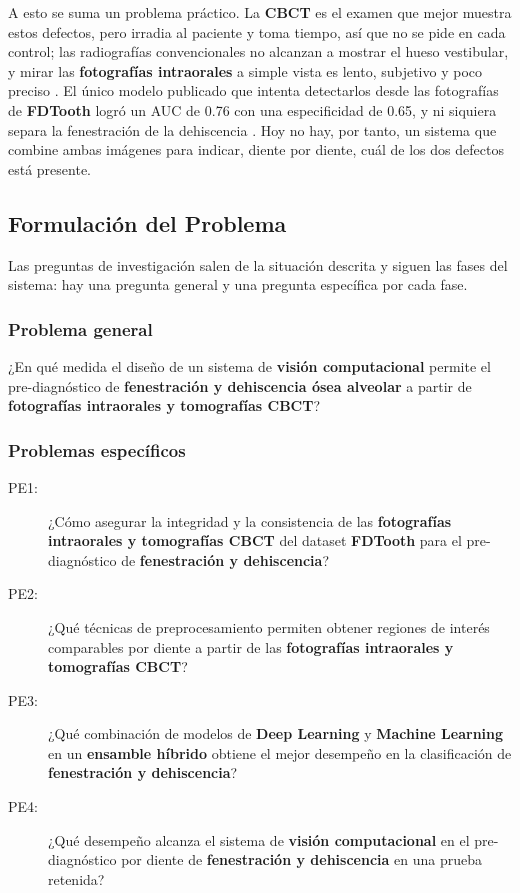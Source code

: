 \documentclass[12pt,a4paper]{article}
\newcommand{\prob}[1]{\textcolor{problema}{\textbf{#1}}}
\newcommand{\sol}[1]{\textcolor{solucion}{\textbf{#1}}}
\newcommand{\dat}[1]{\textcolor{dataset}{\textbf{#1}}}
\newcommand{\prob}[1]{#1}
\newcommand{\sol}[1]{#1}
\newcommand{\dat}[1]{#1}
\begin{document}
A esto se suma un problema práctico. La \dat{CBCT} es el examen que mejor
muestra estos defectos, pero irradia al paciente y toma tiempo, así que no
se pide en cada control; las radiografías convencionales no alcanzan a
mostrar el hueso vestibular, y mirar las \dat{fotografías intraorales} a
simple vista es lento, subjetivo y poco preciso \parencite{liu2025fdtooth}.
El único modelo publicado que intenta detectarlos desde las fotografías de
\dat{FDTooth} logró un AUC de 0.76 con una especificidad de 0.65, y ni
siquiera separa la fenestración de la dehiscencia
\parencite{liu2025fdtooth}. Hoy no hay, por tanto, un sistema que combine
ambas imágenes para indicar, diente por diente, cuál de los dos defectos
está presente.

\subsection{Formulación del Problema}
Las preguntas de investigación salen de la situación descrita y siguen
las fases del sistema: hay una pregunta general y una pregunta específica
por cada fase.

\subsubsection{Problema general}
¿En qué medida el diseño de un sistema de \sol{visión computacional}
permite el pre-diagnóstico de \prob{fenestración y dehiscencia ósea
alveolar} a partir de \dat{fotografías intraorales y tomografías CBCT}?

\subsubsection{Problemas específicos}
\begin{description}
  \item[PE1:] ¿Cómo asegurar la integridad y la consistencia de las
  \dat{fotografías intraorales y tomografías CBCT} del dataset
  \dat{FDTooth} para el pre-diagnóstico de \prob{fenestración y
  dehiscencia}?
  \item[PE2:] ¿Qué técnicas de preprocesamiento permiten obtener regiones
  de interés comparables por diente a partir de las \dat{fotografías
  intraorales y tomografías CBCT}?
  \item[PE3:] ¿Qué combinación de modelos de \sol{Deep Learning} y
  \sol{Machine Learning} en un \sol{ensamble híbrido} obtiene el mejor
  desempeño en la clasificación de \prob{fenestración y dehiscencia}?
  \item[PE4:] ¿Qué desempeño alcanza el sistema de \sol{visión
  computacional} en el pre-diagnóstico por diente de \prob{fenestración y
  dehiscencia} en una prueba retenida?
\end{description}
\end{document}
